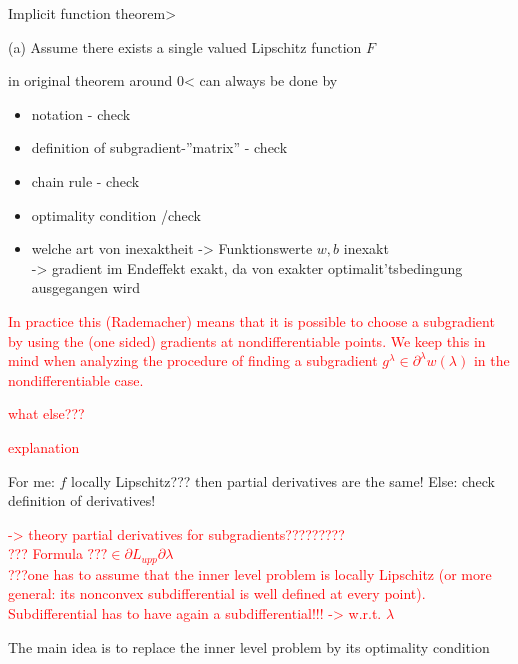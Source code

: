 Implicit function theorem>\\
\begin{theorem}
	(a) Assume there exists a single valued  Lipschitz function \(F\)
\end{theorem}
in original theorem around 0< can always be done by 

\begin{itemize}
	\item notation - check
	\item definition of subgradient-''matrix'' - check
	\item chain rule - check
	\item optimality condition /check
\end{itemize}

\begin{itemize}
	\item welche art von inexaktheit -> Funktionswerte \(w,b\) inexakt\\
	-> gradient im Endeffekt exakt, da von exakter optimalit'tsbedingung ausgegangen wird
\end{itemize}


\textcolor{red}{In practice this (Rademacher) means that it is possible to choose a subgradient by using the (one sided) gradients at nondifferentiable points.
We keep this in mind when analyzing the procedure of finding a subgradient \( g^{\lambda} \in \partial^{\lambda} w(\lambda)\) in the nondifferentiable case.}

\textcolor{red}{what else???}

\textcolor{red}{explanation}








For me: \(f\) locally Lipschitz??? then partial derivatives are the same! Else: check definition of derivatives!

\textcolor{red}{-> theory partial derivatives for subgradients????????? \\
??? Formula \(??? \in \partial L_{upp}{\partial \lambda}\) \\
???one has to assume that the inner level problem is locally Lipschitz (or more general: its nonconvex subdifferential is well defined at every point). \\
Subdifferential has to have again a subdifferential!!! -> w.r.t. \(\lambda\)}


The main idea is to replace the inner level problem by its optimality condition


